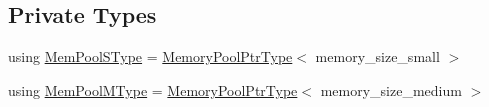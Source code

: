 \subsection*{Private Types}
\begin{DoxyCompactItemize}
\item 
using \hyperlink{structvt_1_1pool_1_1_pool_a9f94985824d12c43357cfe50eaaefd38}{Mem\+Pool\+S\+Type} = \hyperlink{structvt_1_1pool_1_1_pool_a21e20f5b56c3bae4f0d0cc36ed9c5eee}{Memory\+Pool\+Ptr\+Type}$<$ memory\+\_\+size\+\_\+small $>$
\item 
using \hyperlink{structvt_1_1pool_1_1_pool_a8a201b9a843e47cd4e7b568a8e4483da}{Mem\+Pool\+M\+Type} = \hyperlink{structvt_1_1pool_1_1_pool_a21e20f5b56c3bae4f0d0cc36ed9c5eee}{Memory\+Pool\+Ptr\+Type}$<$ memory\+\_\+size\+\_\+medium $>$
\end{DoxyCompactItemize}

